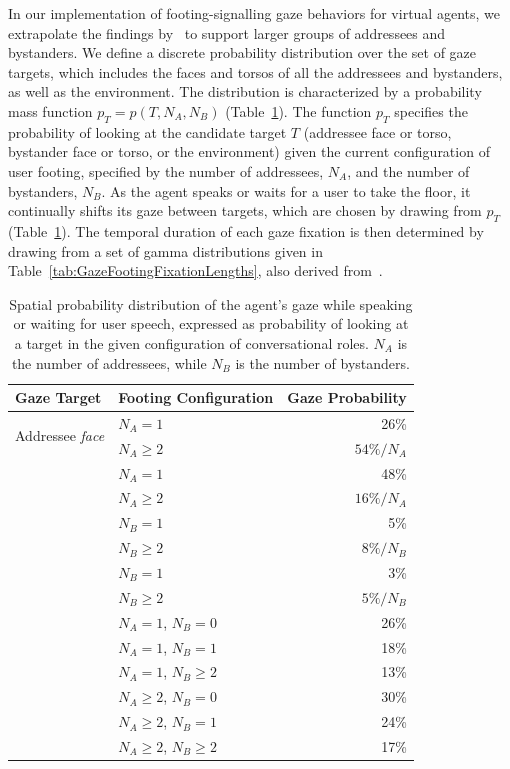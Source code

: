 In our implementation of footing-signalling gaze behaviors for virtual agents, we extrapolate the findings by~\citet{mutlu2012conversational} to support larger groups of addressees and bystanders. We define a discrete probability distribution over the set of gaze targets, which includes the faces and torsos of all the addressees and bystanders, as well as the environment. The distribution is characterized by a probability mass function $p_T = p(T, N_A, N_B)$ (Table~\ref{tab:GazeFootingSpatial}). The function $p_T$ specifies the probability of looking at the candidate target $T$ (addressee face or torso, bystander face or torso, or the environment) given the current configuration of user footing, specified by the number of addressees, $N_A$, and the number of bystanders, $N_B$. As the agent speaks or waits for a user to take the floor, it continually shifts its gaze between targets, which are chosen by drawing from $p_T$ (Table~\ref{tab:GazeFootingSpatial}). The temporal duration of each gaze fixation is then determined by drawing from a set of gamma distributions given in Table~\ref{tab:GazeFootingFixationLengths}, also derived from~\citet{mutlu2012conversational}.

\begin{table}
\small
\centering
\def\arraystretch{1.5}
\begin{tabular}{llr}
\hline
\textbf{Gaze Target} & \textbf{Footing Configuration} & \textbf{Gaze Probability} \\
\hline
\multirow{2}{*}{Addressee \emph{face}} & $N_A = 1$ & 26\% \\
& $N_A \geq 2$ & $54\%/N_A$ \\
\hdashline
\multirow{2}{*}{Addressee \emph{torso}} & $N_A = 1$ & 48\% \\
& $N_A \geq 2$ & $16\%/N_A$ \\
\hdashline
\multirow{2}{*}{Bystander \emph{face}} & $N_B = 1$ & 5\% \\
& $N_B \geq 2$ & $8\%/N_B$ \\
\hdashline
\multirow{2}{*}{Bystander \emph{torso}} & $N_B = 1$ & 3\% \\
& $N_B \geq 2$ & $5\%/N_B$ \\
\hdashline
\multirow{6}{*}{Environment} & $N_A = 1$, $N_B = 0$ & 26\% \\
& $N_A = 1$, $N_B = 1$ & 18\% \\
& $N_A = 1$, $N_B \geq 2$ & 13\% \\
& $N_A \geq 2$, $N_B = 0$ & 30\% \\
& $N_A \geq 2$, $N_B = 1$ & 24\% \\
& $N_A \geq 2$, $N_B \geq 2$ & 17\% \\
\hline
\end{tabular}
\caption{Spatial probability distribution of the agent's gaze while speaking or waiting for user speech, expressed as probability of looking at a target in the given configuration of conversational roles. $N_A$ is the number of addressees, while $N_B$ is the number of bystanders.}
\label{tab:GazeFootingSpatial}
\end{table}


